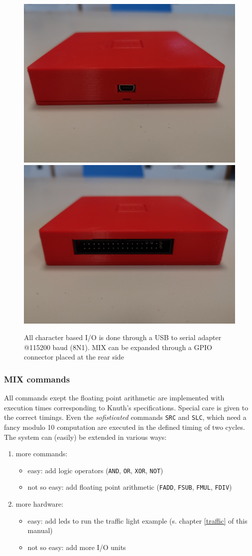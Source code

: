 \documentclass[a4paper,ngerman]{scrartcl}
\begin{document}
\begin{figure}[H]
	\centering
	\includegraphics[width=0.4\linewidth]{../MIX_usb.jpg}
	\includegraphics[width=0.4\linewidth]{../MIX_gpio.jpg}
	
	\caption{All character based I/O is done through a USB to serial adapter @115200 baud (8N1). MIX can be expanded through a GPIO connector placed at the rear side }
	\label{fig:mixusb}
\end{figure}



\subsubsection{MIX commands}
All commands exept the floating point arithmetic are implemented with execution times corresponding to Knuth's specifications. Special care is given to the correct timings. Even the \textit{sofisticated} commands \lstinline|SRC| and \lstinline|SLC|, which need a fancy modulo 10 computation are executed in the defined timing of two cycles. The system can (easily) be extended in various ways:

\begin{enumerate}
	\item more commands:
	\begin{itemize}
		\item easy: add logic operators (\lstinline|AND|, \lstinline|OR|, \lstinline|XOR|, \lstinline|NOT|)
		\item not so easy: add floating point arithmetic (\lstinline|FADD|, \lstinline|FSUB|, \lstinline|FMUL|, \lstinline|FDIV|)
		
	\end{itemize}
	\item  more hardware:
	\begin{itemize}
		\item easy: add leds to run the traffic light example (s. chapter \ref{traffic} of this manual)
		\item not so easy: add more I/O units
	\end{itemize}
	

\end{enumerate}
\end{document}
